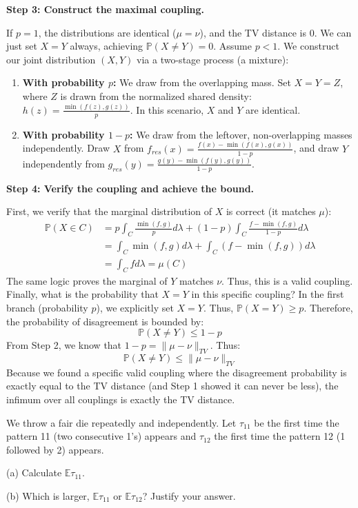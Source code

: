 \begin{solution}
\textbf{Step 3: Construct the maximal coupling.}

If $p=1$, the distributions are identical ($\mu=\nu$), and the TV distance is 0. We can just set $X=Y$ always, achieving $\mathbb{P}(X \neq Y) = 0$.
Assume $p < 1$. We construct our joint distribution $(X,Y)$ via a two-stage process (a mixture):
\begin{enumerate}
    \item \textbf{With probability $p$:} We draw from the overlapping mass. Set $X=Y=Z$, where $Z$ is drawn from the normalized shared density: $h(z) = \frac{\min(f(z), g(z))}{p}$. In this scenario, $X$ and $Y$ are identical.
    \item \textbf{With probability $1-p$:} We draw from the leftover, non-overlapping masses independently. Draw $X$ from $f_{res}(x) = \frac{f(x) - \min(f(x), g(x))}{1-p}$, and draw $Y$ independently from $g_{res}(y) = \frac{g(y) - \min(f(y), g(y))}{1-p}$.
\end{enumerate}

\textbf{Step 4: Verify the coupling and achieve the bound.}

First, we verify that the marginal distribution of $X$ is correct (it matches $\mu$):
\begin{align*}
\mathbb{P}(X \in C) &= p \int_C \frac{\min(f,g)}{p} d\lambda + (1-p) \int_C \frac{f - \min(f,g)}{1-p} d\lambda \\
&= \int_C \min(f,g) d\lambda + \int_C (f - \min(f,g)) d\lambda \\
&= \int_C f d\lambda = \mu(C)
\end{align*}
The same logic proves the marginal of $Y$ matches $\nu$. Thus, this is a valid coupling.
Finally, what is the probability that $X=Y$ in this specific coupling?
In the first branch (probability $p$), we explicitly set $X=Y$. Thus, $\mathbb{P}(X=Y) \geq p$.
Therefore, the probability of disagreement is bounded by:
\[ \mathbb{P}(X \neq Y) \leq 1 - p \]
From Step 2, we know that $1 - p = \|\mu - \nu\|_{TV}$. Thus:
\[ \mathbb{P}(X \neq Y) \leq \|\mu - \nu\|_{TV} \]
Because we found a specific valid coupling where the disagreement probability is exactly equal to the TV distance (and Step 1 showed it can never be less), the infimum over all couplings is exactly the TV distance.
\end{solution}

\begin{exercise}\label{probability:2021:3}
We throw a fair die repeatedly and independently. Let $\tau_{11}$ be the first time the pattern 11 (two consecutive 1's) appears and $\tau_{12}$ the first time the pattern 12 (1 followed by 2) appears.

(a) Calculate $\mathbb{E}\tau_{11}$.

(b) Which is larger, $\mathbb{E}\tau_{11}$ or $\mathbb{E}\tau_{12}$? Justify your answer.
\end{exercise}

